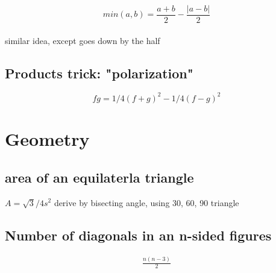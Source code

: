 \documentclass[a4paper, 12pt]{article}
\newcommand{\eq}[1]{\begin{align*}#1\end{align*}} %
\renewcommand{\eq}[1]{\begin{align*}#1\end{align*}} %
\newcommand{\gray}[1]{\textcolor[gray]{0.5}{#1}} %
\begin{document}
$$min(a, b) = \frac{a+b}{2} - \frac{|a-b|}{2}$$ \\
\gray{similar idea, except goes down by the half}

\subsection*{Products trick: "polarization"}

$$fg = 1/4 (f+g)^2 - 1/4 (f-g)^2$$
\section*{Geometry}
\subsection*{area of an equilaterla triangle}
$A = \sqrt{3}/4 s^2$
\gray{derive by bisecting angle, using 30, 60, 90 triangle}

\subsection*{Number of diagonals in an n-sided figures}

\eq{\frac{n(n-3)}{2}}
\end{document}
